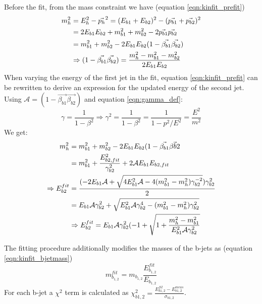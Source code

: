Before the fit, from the mass constraint we have (equation \ref{eqn:kinfit_prefit})
~\vspace{-0.5\baselineskip}
\begin{align}\label{eqn:kinfit_prefit}
m_{h}^2 &= E_{h}^2 - \vec{p_{h}}^2 = (E_{b1}+E_{b2})^2 - (\vec{p_{b1}} + \vec{p_{b2}})^2 \notag\\
& = 2E_{b1}E_{b2} + m_{b1}^2 +m_{b2}^2 - 2\vec{p_{b1}}\vec{p_{b2}} \notag\\
& = m_{b1}^2 +m_{b2}^2 - 2E_{b1}E_{b2}(1-\vec{\beta_{b1}}\vec{\beta_{b2}})\notag\\
&\Rightarrow (1-\vec{\beta_{b1}}\vec{\beta_{b2}}) = \frac{m_h^2 - m_{b1}^2 - m_{b2}^2}{2E_{b1}E_{b2}}
\end{align}
When varying the energy of the first jet in the fit, equation \ref{eqn:kinfit_prefit} can be 
rewritten to derive an expression for the updated energy of the second jet. Using $\mathcal{A} = (1-\vec{\beta_{b1}}\vec{\beta_{b2}})$ 
and equation \ref{eqn:gamma_def}:
~\vspace{-0.5\baselineskip}
\begin{equation}\label{eqn:gamma_def}
\gamma = \frac{1}{1-\beta^2} \Rightarrow \gamma^2 = \frac{1}{1-\beta^2} = \frac{1}{1-p^2/E^2} = \frac{E^2}{m^2}
\end{equation}
We get:
~\vspace{-0.5\baselineskip}
\begin{align}\label{eqn:kinfit_variation}
m_h^2 &= m_{b1}^2 + m_{b2}^2 - 2E_{b1}E_{b2}(1-\vec{\beta_{b1}}\vec{\beta{b2}}\notag\\
&= m_{b1}^2 +\frac{E_{b2,fit}^2}{\gamma_{b2}^2} +2\mathcal{A}E_{b1}E_{b2,fit}\notag\\
\Rightarrow E_{b2}^{fit}& = \frac{(-2E_{b1}\mathcal{A} + \sqrt{4E_{b1}^2\mathcal{A} - 4(m_{b1}^2-m_{h}^2)\gamma_{b2}^{-2}})\gamma_{b2}^2}{2}\notag\\
&= E_{b1}\mathcal{A}\gamma_{b2}^2+\sqrt{E_{b1}^2\mathcal{A}\gamma_{b2}^4 - (m_{b1}^2 - m_{h}^2)\gamma_{b2}^2}\notag\\
&\Rightarrow E_{b2}^{fit} = E_{b1}\mathcal{A}\gamma_{b2}^2(-1 + \sqrt{1+\frac{m_{h}^2 - m_{b1}^2}{E_{b1}^2\mathcal{A}\gamma_{b2}^2}}\\
\end{align}

The fitting procedure additionally modifies the masses of the b-jets as (equation \ref{eqn:kinfit_bjetmass})
~\vspace{-0.5\baselineskip}
\begin{equation}\label{eqn:kinfit_bjetmass}
m_{b_{1,2}}^{fit} = m_{b_{1,2}}\frac{E_{b_{1,2}}^{fit}}{E_{b_{1,2}}}
\end{equation}
For each b-jet a $\chi^2$ term is calculated as $\chi_{b1,2}^2 = \frac{E_{b1,2}^{fit}-E_{b1,2}^{meas}}{\sigma_{b1,2}}$.

